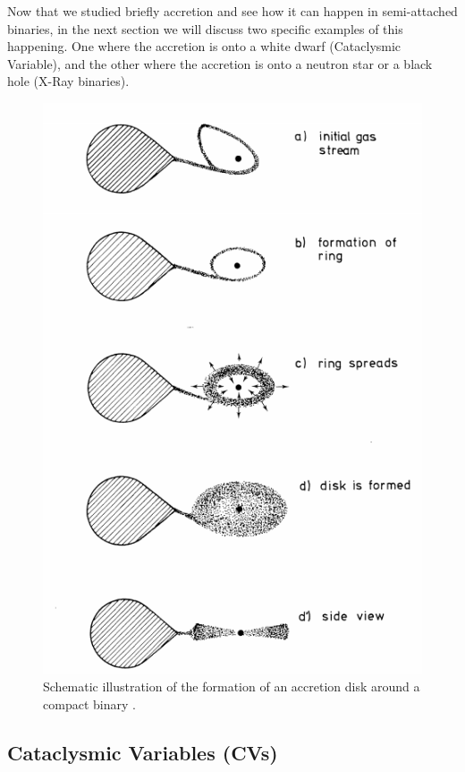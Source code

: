 Now that we studied briefly accretion and see how it can happen in semi-attached binaries, in the next section we will discuss two specific examples of this happening. One where the accretion is onto a white dwarf (Cataclysmic Variable), and the other where the accretion is onto a neutron star or a black hole (X-Ray binaries). 


\begin{figure}[]
        \centering
\includegraphics[scale=.3]{assets/images/accretiondisk.png}
\caption{Schematic illustration of the formation of an accretion disk around a compact binary \citep{verbunt_accretion_1982}.}
\label{fig:roche}
\end{figure}


\subsection{Cataclysmic Variables (CVs)}

